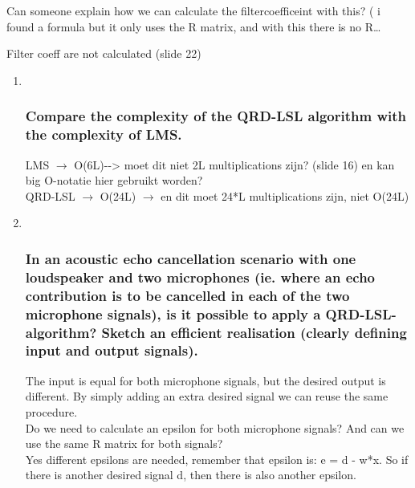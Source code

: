 \documentclass[
  a4paper,
  ,captions=tableheading
]{scrartcl}
\begin{document}
Can someone explain how we can calculate the filtercoefficeint with
this? ( i found a formula but it only uses the R matrix, and with this
there is no R\ldots{}


Filter coeff are not calculated (slide 22)

\begin{enumerate}
\def\labelenumi{\arabic{enumi}.}
\setcounter{enumi}{1}
\item ~
  \subsubsection{Compare the complexity of the QRD-LSL algorithm with
  the complexity of
  LMS.}\label{compare-the-complexity-of-the-qrd-lsl-algorithm-with-the-complexity-of-lms.}

  LMS \(\rightarrow\) O(6L)-\/-\textgreater{} moet dit niet 2L
  multiplications zijn? (slide 16) en kan big O-notatie hier gebruikt
  worden?\\
  QRD-LSL \(\rightarrow\) O(24L) \(\rightarrow\) en dit moet 24*L
  multiplications zijn, niet O(24L)
\item ~
  \subsubsection{In an acoustic echo cancellation scenario with one
  loudspeaker and two microphones (ie. where an echo contribution is to
  be cancelled in each of the two microphone signals), is it possible to
  apply a QRD-LSL-algorithm? Sketch an efficient realisation (clearly
  defining input and output
  signals).}\label{in-an-acoustic-echo-cancellation-scenario-with-one-loudspeaker-and-two-microphones-ie.-where-an-echo-contribution-is-to-be-cancelled-in-each-of-the-two-microphone-signals-is-it-possible-to-apply-a-qrd-lsl-algorithm-sketch-an-efficient-realisation-clearly-defining-input-and-output-signals.}

  The input is equal for both microphone signals, but the desired output
  is different. By simply adding an extra desired signal we can reuse
  the same procedure.\\
  Do we need to calculate an epsilon for both microphone signals? And
  can we use the same R matrix for both signals?\\
  Yes different epsilons are needed, remember that epsilon is: e = d -
  w*x. So if there is another desired signal d, then there is also
  another epsilon.
\end{enumerate}
\end{document}
